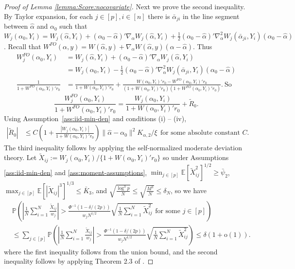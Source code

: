 \documentclass[11pt]{article}
\begin{document}
\begin{proof}[Proof of Lemma \ref{lemma:Score:nocovariate}]
Next we prove the second inequality. By Taylor expansion, for each $j\in [p], i\in[n]$ there is $\bar\alpha_{ji}$ in the line segment between $\hat \alpha$ and $\alpha_0$ such that
$W_j(\alpha_0,Y_i) = W_j(\hat{\alpha},Y_i) + (\alpha_0-\hat{\alpha})'\nabla_\alpha W_j(\hat{\alpha},Y_i) + \frac{1}{2}(\alpha_0-\hat\alpha)'\nabla_\alpha^2 W_j(\bar{\alpha}_{ji},Y_i)(\alpha_0-\hat\alpha)$. Recall that $W^{FO}(\alpha,y)=W(\hat \alpha,y)+\nabla_\alpha W(\hat\alpha,y)(\alpha-\hat\alpha)$. Thus 
$$ \begin{array}{rl}
W^{FO}_j(\alpha_0,Y_i) &= W_j(\hat \alpha,Y_i) + (\alpha_0-\hat\alpha)'\nabla_\alpha W_j(\hat\alpha,Y_i)\\
& = W_j(\alpha_0,Y_i)-\frac{1}{2}(\alpha_0-\hat\alpha)'\nabla_\alpha^2 W_j(\bar{\alpha}_{ji},Y_i)(\alpha_0-\hat\alpha)\\
\displaystyle\frac{1}{1+W^{FO}(\alpha_0,Y_i)'r_0} &\displaystyle= \frac{1}{1+W(\alpha_0,Y_i)'r_0}+\frac{W(\alpha_0,Y_i)'r_0 -W^{FO}(\alpha_0,Y_i)'r_0}{(1+W(\alpha_0,Y_i)'r_0)(1+W^{FO}(\alpha_0,Y_i)'r_0)}.\ \mbox{So}
\end{array}$$ 
\begin{equation}\label{eq:Wj:WjFO:nocovariate}  \frac{W^{FO}_j(\alpha_0,Y_i) }{1+W^{FO}(\alpha_0,Y_i)'r_0} =  \frac{W_j(\alpha_0,Y_i)}{1+W(\alpha_0,Y_i)'r_0} + \widetilde R_0.
\end{equation}
Using Assumption~\ref{ass:iid-min-den} and conditions (i) -- (iv), 
$$\begin{array}{rl}
\displaystyle|\widetilde R_0| 
& \displaystyle\leq C\left(1+\frac{|W_j(\alpha_0,Y_i)| }{1+W(\alpha_0,Y_i)'r_0}\right) \|\hat\alpha - \alpha_0\|^2 K_{\alpha,2}/\xi\ \ \mbox{for some absolute constant }C.
\end{array}$$
The third inequality follows by applying the self-normalized moderate deviation theory. Let $\tilde X_{ij} := W_j(\alpha_0,Y_i) / \{1+W(\alpha_0,Y_i)'r_0\}$ so under Assumptions \ref{ass:iid-min-den} and \ref{ass:moment-assumptions}, ${\displaystyle\min_{j\in[p]}}\mathbb{E}[\tilde X_{ij}^2 ]^{1/2}\geq \bar\psi_2$, ${\displaystyle\max_{j\in[p]}}\mathbb{E}[ |\tilde X_{ij}|^3 ]^{1/3} \leq \bar K_3$, and  $\sqrt{\frac{\log^3p}{N}}\leq\sqrt{\frac{M^3}{N}}\leq\delta_N$, so we have 
$$\begin{array}{rl}
&\displaystyle \mathbb{P} \left( \left| \frac{1}{N}\sum_{i=1}^N \frac{\tilde X_{ij}}{w_j} \right| > \frac{\Phi^{-1}(1-\delta/(2p))}{w_j N^{1/2}} \sqrt{\frac{1}{N}\sum_{i=1}^N \tilde X_{ij}^2} \mbox{ for some }j\in[p] \right)\\
&\displaystyle \leq  \sum_{j\in [p]} \mathbb{P} \left( \left|\frac{1}{N}\sum_{i=1}^N\frac{\tilde X_{ij}}{w_j} \right| > \frac{\Phi^{-1}(1-\delta/(2p))}{w_jN^{1/2}} \sqrt{\frac{1}{N}\sum_{i=1}^N \tilde X_{ij}^2 } \right)\leq \delta(1+\mathrm{o}(1)).
\end{array}$$
where the first inequality follows from the union bound, and the second inequality follows by applying Theorem 2.3 of \citet{jing2003self}.
\end{proof}
\end{document}
